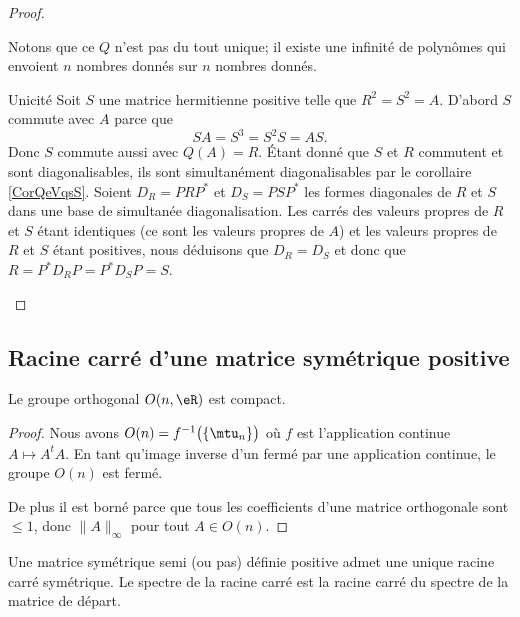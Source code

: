 \begin{proof}
\begin{subproof}
        Notons que ce \( Q\) n'est pas du tout unique; il existe une infinité de polynômes qui envoient \( n\) nombres donnés sur \( n\) nombres donnés.

    \item[Unicité]
        Soit \( S\) une matrice hermitienne positive telle que \( R^2=S^2=A\). D'abord \( S\) commute avec \( A\) parce que
        \begin{equation}
            SA=S^3=S^2S=AS.
        \end{equation}
        Donc \( S\) commute aussi avec \( Q(A)=R\). Étant donné que \( S\) et \( R\) commutent et sont diagonalisables, ils sont simultanément diagonalisables par le corollaire \ref{CorQeVqsS}. Soient \( D_R=PRP^*\) et \( D_S=PSP^*\) les formes diagonales de \( R\) et \( S\) dans une base de simultanée diagonalisation. Les carrés des valeurs propres de \( R\) et \( S\) étant identiques (ce sont les valeurs propres de \( A\)) et les valeurs propres de \( R\) et \( S\) étant positives, nous déduisons que \( D_R=D_S\) et donc que \( R=P^*D_RP=P^*D_SP=S\).
    \end{subproof}
\end{proof}

\subsection{Racine carré d'une matrice symétrique positive}

\begin{lemma}   \label{LemTLlTAAf}
    Le groupe orthogonal \( O(n,\eR) \) est compact.
\end{lemma}

\begin{proof}
    Nous avons \( O(n)=f^{-1}\big( \{ \mtu_n \} \big)\) où \( f\) est l'application continue \( A\mapsto A^tA\). En tant qu'image inverse d'un fermé par une application continue, le groupe \( O(n)\) est fermé.

    De plus il est borné parce que tous les coefficients d'une matrice orthogonale sont \( \leq 1\), donc \( \| A \|_{\infty}\) pour tout \( A\in O(n)\).
\end{proof}

\begin{proposition} \label{PropPEMDqVT}
    Une matrice symétrique semi (ou pas) définie positive admet une unique racine carré symétrique. Le spectre de la racine carré est la racine carré du spectre de la matrice de départ.
\end{proposition}

